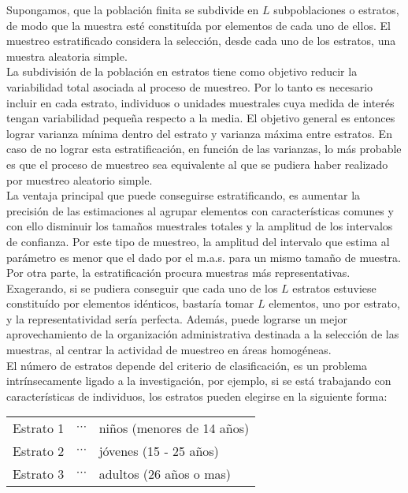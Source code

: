 \documentclass[base=hide,11pt]{elegantbook}
\begin{document}
{Supongamos, que la población finita se subdivide en $L$ subpoblaciones o estratos, de modo que la muestra esté constituída por elementos de cada uno de ellos. El  muestreo estratificado considera la selección, desde cada uno de los estratos, una muestra aleatoria simple.\\
%			
La subdivisión de la población en estratos tiene como objetivo reducir la variabilidad total asociada al proceso de muestreo. Por lo tanto es necesario incluir en cada estrato, individuos o unidades muestrales cuya medida de interés tengan variabilidad pequeña respecto a la media. El objetivo general es entonces lograr varianza mínima dentro del estrato y varianza máxima entre estratos. En caso de no lograr esta estratificación, en función de las varianzas, lo más probable es que el proceso de muestreo sea equivalente al que se pudiera haber realizado por muestreo aleatorio simple.\\
%			
La ventaja principal que puede conseguirse estratificando, es aumentar la precisión de las estimaciones al agrupar elementos con características comunes y con ello disminuir los tamaños muestrales totales y la amplitud de los intervalos de confianza. Por este tipo de muestreo, la amplitud del intervalo que estima al parámetro es menor que el dado por el m.a.s. para un mismo tamaño de muestra.\\
			
Por otra parte, la estratificación procura muestras  más representativas. Exagerando, si se pudiera conseguir que cada uno de los $L$ estratos estuviese constituído por elementos idénticos, bastaría tomar $L$ elementos, uno por estrato, y la representatividad sería perfecta. Además, puede lograrse un mejor aprovechamiento de la organización administrativa destinada a la selección de las muestras, al centrar la actividad de muestreo en áreas homogéneas.\\
%			
El número de estratos depende del criterio de clasificación, es un problema intrínsecamente ligado a la investigación, por ejemplo, si se está trabajando con características de individuos, los estratos pueden elegirse en la siguiente forma:
			\begin{center}
				\begin{tabular}{lll}
					Estrato 1&$\cdots$ & niños (menores de 14 años)\\
					Estrato 2&$\cdots$ & jóvenes (15 - 25 años)\\
					Estrato 3&$\cdots$ & adultos (26 años o mas)\\
				\end{tabular}	
			\end{center}

}
\end{document}
